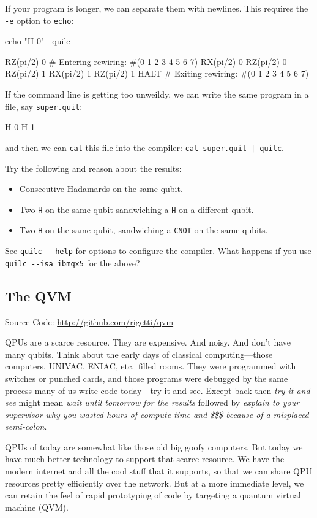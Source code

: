 If your program is longer, we can separate them with newlines. This requires the \verb|-e| option to \verb|echo|:
\begin{bash}
echo "H 0" | quilc

RZ(pi/2) 0                  # Entering rewiring: #(0 1 2 3 4 5 6 7)
RX(pi/2) 0
RZ(pi/2) 0
RZ(pi/2) 1
RX(pi/2) 1
RZ(pi/2) 1
HALT                        # Exiting rewiring: #(0 1 2 3 4 5 6 7)
\end{bash}

If the command line is getting too unweildy, we can write the same program in a file, say \verb|super.quil|:
\begin{quil}
H 0
H 1
\end{quil}
and then we can \verb|cat| this file into the compiler: \verb/cat super.quil | quilc/.

Try the following and reason about the results:
\begin{itemize}
\item Consecutive Hadamards on the same qubit.
\item Two \verb|H| on the same qubit sandwiching a \verb|H| on a different qubit.
\item Two \verb|H| on the same qubit, sandwiching a \verb|CNOT| on the same qubits.
\end{itemize}

See \verb|quilc --help| for options to configure the compiler. What happens if you use \verb|quilc --isa ibmqx5| for the above?

\subsection{The QVM}
\begin{center}
Source Code: \url{http://github.com/rigetti/qvm}
\end{center}

QPUs are a scarce resource. They are expensive. And noisy. And don't have many qubits. Think about the early days of classical computing---those computers, UNIVAC, ENIAC, etc.\ filled rooms. They were programmed with switches or punched cards, and those programs were debugged by the same process many of us write code today---try it and see. Except back then \emph{try it and see} might mean \emph{wait until tomorrow for the results} followed by \emph{explain to your supervisor why you wasted hours of compute time and \$\$\$ because of a misplaced semi-colon}.

QPUs of today are somewhat like those old big goofy computers. But today we have much better technology to support that scarce resource. We have the modern internet and all the cool stuff that it supports, so that we can share QPU resources pretty efficiently over the network. But at a more immediate level, we can retain the feel of rapid prototyping of code by targeting a quantum virtual machine (QVM).

